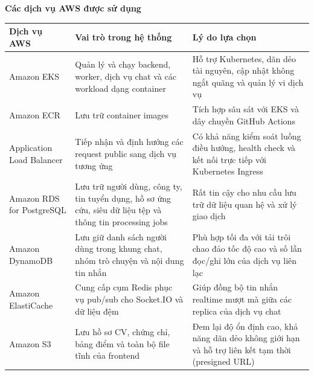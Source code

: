 \vspace{0.5em}\noindent\textbf{Các dịch vụ AWS được sử
dụng}\par

{
\begingroup
\small
\setlength{\tabcolsep}{3pt}
\renewcommand{\arraystretch}{1.15}
\begin{longtable}{@{}
  >{\raggedright\arraybackslash}p{}
  >{\raggedright\arraybackslash}p{}
  >{\raggedright\arraybackslash}p{}@{}}
\toprule\noalign{}
\begin{minipage}[b]{\linewidth}\raggedright
Dịch vụ AWS
\end{minipage} & \begin{minipage}[b]{\linewidth}\raggedright
Vai trò trong hệ thống
\end{minipage} & \begin{minipage}[b]{\linewidth}\raggedright
Lý do lựa chọn
\end{minipage} \\
\midrule\noalign{}
\endhead
\bottomrule\noalign{}
\endlastfoot
Amazon EKS & Quản lý và chạy backend, worker, dịch vụ chat và các
workload dạng container & Hỗ trợ Kubernetes, dãn dẻo tài nguyên, cập
nhật không ngắt quãng và quản lý vi dịch vụ \\
Amazon ECR & Lưu trữ container images & Tích hợp sâu sát với EKS và dây
chuyền GitHub Actions \\
Application Load Balancer & Tiếp nhận và định hướng các request public
sang dịch vụ tương ứng & Có khả năng kiểm soát luồng điều hướng, health
check và kết nối trực tiếp với Kubernetes Ingress \\
Amazon RDS for PostgreSQL & Lưu trữ người dùng, công ty, tin tuyển dụng,
hồ sơ ứng cứu, siêu dữ liệu tệp và thông tin processing jobs & Rất tin
cậy cho nhu cầu lưu trữ dữ liệu quan hệ và xử lý giao dịch \\
Amazon DynamoDB & Lưu giữ danh sách người dùng trong khung chat, nhóm
trò chuyện và nội dung tin nhắn & Phù hợp tối đa với tải trôi chao đảo
tốc độ cao và số lần đọc/ghi lớn của dịch vụ liên lạc \\
Amazon ElastiCache & Cung cấp cụm Redis phục vụ pub/sub cho Socket.IO và
dữ liệu đệm & Giúp đồng bộ tin nhắn realtime mượt mà giữa các replica
của dịch vụ chat \\
Amazon S3 & Lưu hồ sơ CV, chứng chỉ, bảng điểm và toàn bộ file tĩnh của
frontend & Đem lại độ ổn định cao, khả năng dãn dẻo không giới hạn và hỗ
trợ liên kết tạm thời (presigned URL) \\

\end{longtable}}
